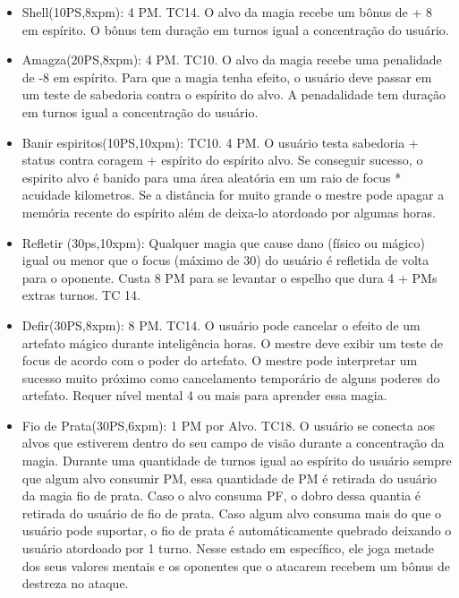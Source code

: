 \begin{itemize}
	\item Shell(10PS,8xpm): 4 PM. TC14.\newline %
O alvo da magia recebe um bônus de + 8 em espírito. O bônus tem duração em turnos igual a concentração do usuário.
	
	\item Amagza(20PS,8xpm): 4 PM. TC10.\newline
 O alvo da magia recebe uma penalidade de -8 em espírito. Para que a magia tenha efeito, o usuário deve passar em um teste de sabedoria contra o espírito do alvo. A penadalidade tem duração em turnos igual a concentração do usuário.
  
	\item Banir espiritos(10PS,10xpm): TC10. 4 PM.\newline
O usuário testa sabedoria + status contra coragem + espírito do espírito alvo. Se conseguir sucesso, o espirito alvo é banido para uma área aleatória em um raio de focus * acuidade kilometros. Se a distância for muito grande o mestre pode apagar a memória recente do espírito além de deixa-lo atordoado por algumas horas.

\item Refletir (30ps,10xpm): Qualquer magia que cause dano (físico ou mágico) igual ou menor que o focus (máximo de 30) do usuário é refletida de volta para o oponente. Custa 8 PM para se levantar o espelho que dura 4 + PMs extras turnos. TC 14. 
 	
	\item Defir(30PS,8xpm): 8 PM. TC14.\newline
O usuário pode cancelar o efeito de um artefato mágico durante inteligência horas. O mestre deve exibir um teste de focus de acordo com o poder do artefato. O mestre pode interpretar um sucesso muito próximo como cancelamento temporário de alguns poderes do artefato. Requer nível mental 4 ou mais para aprender essa magia. 

	\item Fio de Prata(30PS,6xpm): 1 PM por Alvo. TC18.\newline
O usuário se conecta aos alvos que estiverem dentro do seu campo de visão durante a concentração da magia. Durante uma quantidade de turnos igual ao espírito do usuário sempre que algum alvo consumir PM, essa quantidade de PM é retirada do usuário da magia fio de prata. Caso o alvo consuma PF, o dobro dessa quantia é retirada do usuário de fio de prata. Caso algum alvo consuma mais do que o usuário pode suportar, o fio de prata é automáticamente quebrado deixando o usuário atordoado por 1 turno. Nesse estado em específico, ele joga metade dos seus valores mentais e os oponentes que o atacarem recebem um bônus de destreza no ataque. 


\end{itemize}
